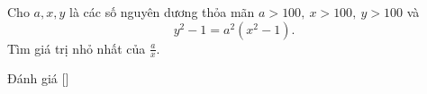 \ifshowproblem
\begin{problem}\label{problem:RUS-2015-MO-9-P3}
    Cho \( a, x, y \) là các số nguyên dương thỏa mãn \( a > 100,\ x > 100,\ y > 100 \) và
    \[
        y^2 - 1 = a^2(x^2 - 1).
    \]
    Tìm giá trị nhỏ nhất của \( \frac{a}{x} \).    
\end{problem}
\fi

\ifshowinfo
Đánh giá [\textbf{}]\footnotemark
{}
\fi